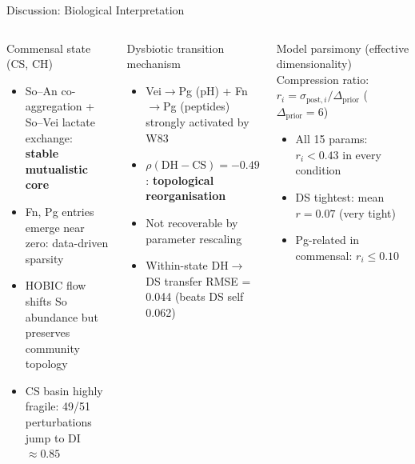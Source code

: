 \documentclass[aspectratio=169,10pt,t]{beamer}
\begin{document}
\begin{frame}[t]{Discussion: Biological Interpretation}
  \small\vspace{-2pt}
  \begin{columns}[T]
      \begin{block}{Commensal state (CS, CH)}
        \begin{itemize}\setlength{\itemsep}{2pt}
          \item So--An co-aggregation + So--Vei lactate exchange:\\
                \textbf{stable mutualistic core}
          \item Fn, Pg entries emerge near zero: data-driven sparsity
          \item HOBIC flow shifts So abundance but preserves community topology
          \item CS basin highly fragile: 49/51 perturbations jump to DI$\approx0.85$
        \end{itemize}
      \end{block}
      \vspace{5pt}
      \begin{block}{Dysbiotic transition mechanism}
        \begin{itemize}\setlength{\itemsep}{2pt}
          \item Vei$\to$Pg (pH) + Fn$\to$Pg (peptides) strongly activated by W83
          \item $\rho(\mathrm{DH}{-}\mathrm{CS})=-0.49$: \textbf{topological reorganisation}
          \item Not recoverable by parameter rescaling
          \item Within-state DH$\to$DS transfer RMSE = 0.044 (beats DS self 0.062)
        \end{itemize}
      \end{block}
      \begin{block}{Model parsimony (effective dimensionality)}
        Compression ratio: $r_i=\sigma_{\mathrm{post},i}/\Delta_{\mathrm{prior}}$
        ($\Delta_{\mathrm{prior}}=6$)\vspace{3pt}
        \begin{itemize}\setlength{\itemsep}{1pt}
          \item All 15 params: $r_i<0.43$ in every condition
          \item DS tightest: mean $r=0.07$ (very tight)
          \item Pg-related in commensal: $r_i\leq0.10$

\end{itemize}
\end{block}
\end{columns}
\end{frame}
\end{document}
